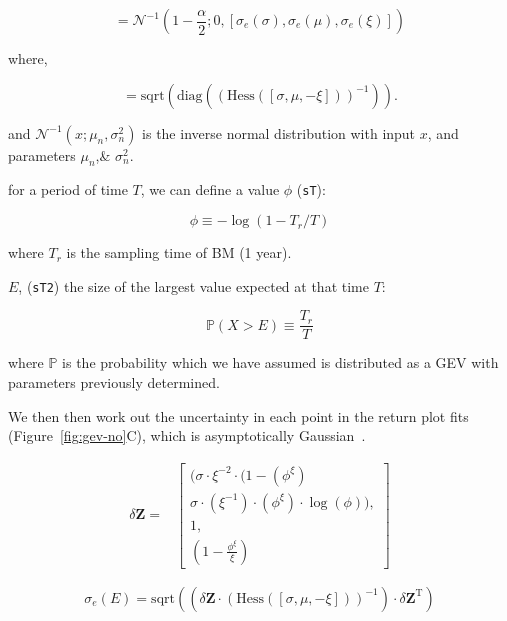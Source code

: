 \begin{equation}
[\Delta \sigma , \Delta \mu, \Delta \xi] =
\mathcal{N}^{-1}(1-\frac{\alpha}{2}; 0, [\sigma_e (\sigma), \sigma_e (\mu), \sigma_e (\xi)])
\end{equation}

where,

\begin{equation}
[\sigma_e (\sigma), \sigma_e (\mu), \sigma_e (\xi)] =
\mathrm{sqrt}\left(\mathrm{diag}\left(\left( \mathrm{Hess}([\sigma, \mu, -\xi]) \right)^{-1} \right)\right).
\end{equation}

and $\mathcal{N}^{-1}(x; \mu_n, \sigma_n^2)$ is the inverse normal distribution
with input $x$, and parameters $\mu_n$,\& $\sigma_n^2$.

for a period of time $T$, we can define a value $\phi$ (\texttt{sT}):

\begin{equation}
\phi \equiv - \log(1 - T_{r}/T)
\end{equation}

where $T_r$ is the sampling time of BM (1 year).

$E$, (\texttt{sT2}) the size of the largest value expected at that time $T$:

\begin{equation}
\mathbb{P}(X>E) \equiv \frac{T_r}{T}
\end{equation}

where $\mathbb{P}$ is the probability which we have assumed is
distributed as a GEV with parameters previously determined.

We then then work out the uncertainty in each point in the
return plot fits (Figure~\ref{fig:gev-no}C), which is asymptotically
Gaussian~\cite{doob1935limiting}.

\begin{align}
\delta \mathbf{Z} = & \left[ \begin{array}{l}(\sigma\cdot\xi^{-2} \cdot (1-(\phi^{\xi})
            \\ \sigma \cdot (\xi^{-1})\cdot (\phi^{\xi}) \cdot \log(\phi)),\\
            1,\\
            (1- \frac{\phi^{\xi}}{\xi})
            \end{array} \right]
\end{align}

\begin{equation}
\sigma_e(E) = \mathrm{sqrt}\left(\left(\delta \mathbf{Z} \cdot \left( \mathrm{Hess}\left([\sigma, \mu, -\xi]\right)
\right)^{-1} \right) \cdot  \delta \mathbf{Z}^{\mathrm{T}}\right)
\end{equation}

